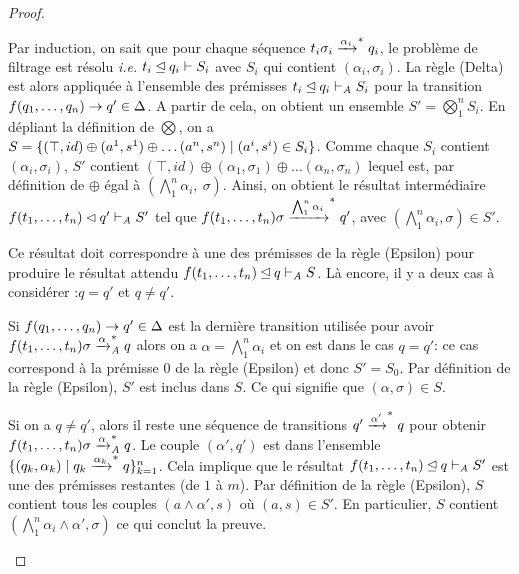 \begin{proof}
\begin{itemize}
  Par induction, on sait que pour chaque séquence $t_i\sigma_i
  \xrightarrow{\alpha_i}^* q_i$, le problème de filtrage est résolu \textit{i.e.}
  $t_i \unlhd q_i \vdash S_i$ avec $S_i$ qui contient $(\alpha_i, \sigma_i)$.
  La règle (Delta) est alors appliquée à l'ensemble des prémisses $t_i \unlhd q_i \vdash_\mathit A S_i$ pour la transition $f(q_1,\dots,q_n) \rightarrow q' \in \Delta$.  A partir de cela,
  on obtient un ensemble $S' = \bigotimes^n_1 S_i$.  En dépliant la définition de $\bigotimes$, on a $S = \{(\top, id) \oplus (a^1, s^1) \oplus \dots (a^n, s^n) \; | \; (a^i, s^i) \in S_i \}$. 
  Comme chaque $S_i$ contient $(\alpha_i, \sigma_i)$, $S'$ contient $(\top, id) \oplus (\alpha_1, \sigma_1) \oplus \dots (\alpha_n, \sigma_n)$ lequel est, par définition de $\oplus$ égal à $(\bigwedge_1^n \alpha_i,\ \sigma)$.
  Ainsi, on obtient le résultat intermédiaire $f(t_1, \dots, t_n) \lhd q' \vdash_\mathit A S'$ tel que $f(t_1, \dots, t_n)\sigma \xrightarrow{\bigwedge_1^n \alpha_i}^* q'$,
  avec $(\bigwedge_1^n \alpha_i, \sigma) \in S'$.

  Ce résultat doit correspondre à une des prémisses de la règle (Epsilon) pour produire le résultat attendu $f(t_1,\dots, t_n) \unlhd q \vdash_\mathit A S$.
  Là encore, il y a deux cas à considérer :$q=q'$ et $q \not = q'$.

  Si $f(q_1,\dots,q_n) \rightarrow q' \in \Delta$ est la dernière transition utilisée pour avoir $f(t_1, \dots, t_n)\sigma \xrightarrow{\alpha}_\mathit A^* q$ alors
  on a $\alpha = \bigwedge_1^n \alpha_i$ et on est dans le cas $q = q'$: ce cas correspond à la prémisse $0$ de la règle (Epsilon) et donc $S' = S_0$.
  Par définition de la règle (Epsilon), $S'$ est inclus dans $S$. Ce qui signifie que $(\alpha, \sigma) \in S$.

  Si on a $q \not= q'$, alors il reste une séquence de transitions $q' \xrightarrow{\alpha'}^* q$ pour obtenir $f(t_1, \dots, t_n)\sigma \xrightarrow{\alpha}_\mathit A^* q$.
  Le couple $(\alpha', q')$ est dans l'ensemble $\{ (q_k, \alpha_k) \; | \; q_k \xrightarrow{\alpha_k}^* q\}_{k=1}^n$.%
  Cela implique que le résultat $f(t_1,\dots, t_n) \unlhd q \vdash_\mathit A S'$ est une des prémisses restantes (de $1$ à $m$).
  Par définition de la règle (Epsilon), $S$ contient tous les couples $(a \land \alpha', s)$ où $(a, s) \in S'$. 
  En particulier, $S$ contient $(\bigwedge_1^n \alpha_i \land \alpha', \sigma)$ ce qui conclut la preuve.
\end{itemize}
\end{proof}

